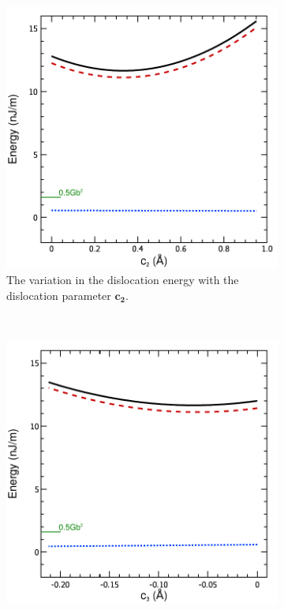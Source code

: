 \begin{figure}
\begin{subfigure}{0.4\textwidth}
\centering
\includegraphics[width=\textwidth]{U_vs_c2}
\caption{The variation in the dislocation energy with the dislocation parameter $\mathbf{c_2}$.}
\end{subfigure}
~
\begin{subfigure}{0.4\textwidth}
\centering
\includegraphics[width=\textwidth]{U_vs_c3}

\end{subfigure}
\end{figure}

